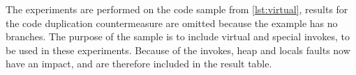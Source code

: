 The experiments are performed on the code sample from \cref{lst:virtual}, results for the code duplication countermeasure are omitted because the example has no branches. The purpose of the sample is to include virtual and special invokes, to be used in these experiments. Because of the invokes, heap and locals faults now have an impact, and are therefore included in the result table.\\\\
